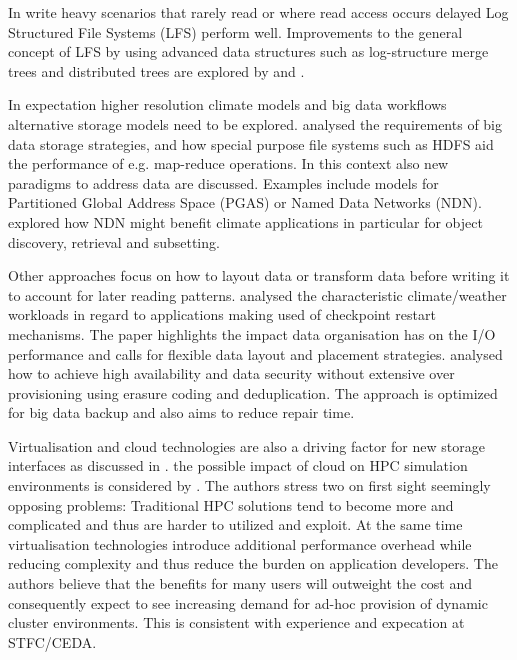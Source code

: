 In write heavy scenarios that rarely read or where read access occurs delayed Log Structured File Systems (LFS) perform well.
Improvements to the general concept of LFS by using advanced data structures such as log-structure
merge trees and distributed trees are explored by \cite{oneil_log-structured_1996} and \cite{ben_stopford_log_2015}.

In expectation higher resolution climate models and big data workflows alternative storage models need to be explored.
\cite{kaur_survey_2015} analysed the requirements of big data storage strategies, and how special purpose file systems such as HDFS aid the performance  of e.g. map-reduce operations.
In this context also new paradigms to address data are discussed.
Examples include models for Partitioned Global Address Space (PGAS) or Named Data Networks (NDN).
\cite{olschanowsky_supporting_2014} explored how NDN might benefit climate applications in particular for object discovery, retrieval and subsetting.

Other approaches focus on how to layout data or transform data before writing it to account for later reading patterns.
\cite{lofstead_six_2011} analysed the characteristic climate/weather workloads in regard to applications making used of checkpoint restart mechanisms.
The paper highlights the impact data organisation has on the I/O performance and calls for flexible data layout and placement strategies.
\cite{yin_robot:_2013} analysed how to achieve high availability and data security without extensive over provisioning using erasure coding and deduplication. The approach is optimized for big data backup and also aims to reduce repair time.


Virtualisation and cloud technologies are also a driving factor for new storage interfaces as discussed in .
the possible impact of cloud on HPC simulation environments is considered by \cite{mancini_how_2015}.
The authors stress two on first sight seemingly opposing problems:
Traditional HPC solutions tend to become more and complicated and thus are harder to utilized and exploit.
At the same time virtualisation technologies introduce additional performance overhead while reducing complexity and thus reduce the burden on application developers.
The authors believe that the benefits for many users will outweight the cost and consequently expect to see increasing demand for ad-hoc provision of dynamic cluster environments. This is consistent with experience and expecation at STFC/CEDA.


